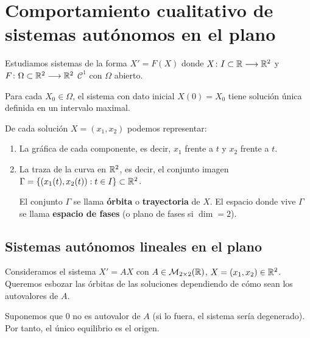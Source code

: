 
\section{Comportamiento cualitativo de sistemas autónomos en el plano}

Estudiamos sistemas de la forma $\boxed{X'=F(X)}$ donde $X \colon I\subset \mathbb{R} \longrightarrow \mathbb{R}^2$ y $F \colon \Omega\subset \mathbb{R}^2 \longrightarrow \mathbb{R}^2$ $\mathcal{C}^1$ con $\Omega$ abierto.

Para cada $X_0 \in \Omega$, el sistema con dato inicial $X(0)=X_0$ tiene solución única definida en un intervalo maximal.

De cada solución $X = (x_1, x_2)$ podemos representar:
\begin{enumerate}
	\item La gráfica de cada componente, es decir, $x_1$ frente a $t$ y $x_2$ frente a $t$.
	\item La traza de la curva en $\mathbb{R}^2$, es decir, el conjunto imagen $\Gamma = \left\{\left(x_1(t), x_2(t)\right) : t\in I\right\} \subset \mathbb{R}^2$.

	      El conjunto $\Gamma$ se llama \textbf{órbita} o \textbf{trayectoria} de $X$. El espacio donde vive $\Gamma$ se llama \textbf{espacio de fases} (o plano de fases si $\dim = 2$).
\end{enumerate}

\subsection{Sistemas autónomos lineales en el plano}

Consideramos el sistema $\boxed{X'=AX}$ con $A\in \mathcal{M}_{2\times 2}(\mathbb{R})$, $X=(x_1, x_2)\in \mathbb{R}^2$. Queremos esbozar las órbitas de las soluciones dependiendo de cómo sean los autovalores de $A$.

Suponemos que 0 no es autovalor de $A$ (si lo fuera, el sistema sería degenerado). Por tanto, el único equilibrio es el origen.

